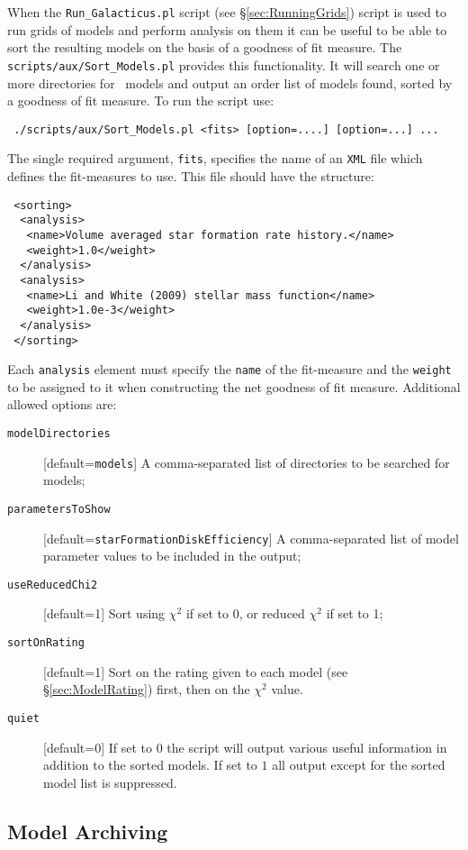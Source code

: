 When the {\tt Run\_Galacticus.pl} script (see \S\ref{sec:RunningGrids}) script is used to run grids of models and perform analysis on them it can be useful to be able to sort the resulting models on the basis of a goodness of fit measure. The {\tt scripts/aux/Sort\_Models.pl} provides this functionality. It will search one or more directories for \glc\ models and output an order list of models found, sorted by a goodness of fit measure. To run the script use:
\begin{verbatim}
 ./scripts/aux/Sort_Models.pl <fits> [option=....] [option=...] ...
\end{verbatim}
The single required argument, {\tt fits}, specifies the name of an {\tt XML} file which defines the fit-measures to use. This file should have the structure:
\begin{verbatim}
 <sorting>
  <analysis>
   <name>Volume averaged star formation rate history.</name>
   <weight>1.0</weight>
  </analysis>
  <analysis>
   <name>Li and White (2009) stellar mass function</name>
   <weight>1.0e-3</weight>
  </analysis>
 </sorting>
\end{verbatim}
Each {\tt analysis} element must specify the {\tt name} of the fit-measure and the {\tt weight} to be assigned to it when constructing the net goodness of fit measure. Additional allowed options are:
\begin{description}
 \item [{\tt modelDirectories}] [default={\tt models}] A comma-separated list of directories to be searched for models;
 \item [{\tt parametersToShow}] [default={\tt starFormationDiskEfficiency}] A comma-separated list of model parameter values to be included in the output;
 \item [{\tt useReducedChi2}] [default=1] Sort using $\chi^2$ if set to 0, or reduced $\chi^2$ if set to 1;
 \item [{\tt sortOnRating}] [default=1] Sort on the rating given to each model (see \S\ref{sec:ModelRating}) first, then on the $\chi^2$ value.
 \item [{\tt quiet}] [default=0] If set to $0$ the script will output various useful information in addition to the sorted models. If set to $1$ all output except for the sorted model list is suppressed.
\end{description}

\subsection{Model Archiving}\label{sec:ModelArchiving}

